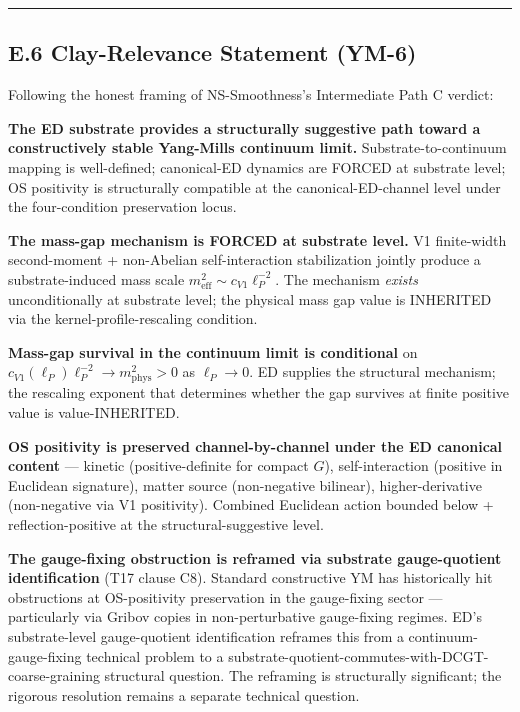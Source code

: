 \documentclass[
  11pt,a4paper]{article}
\begin{document}
\begin{center}\rule{0.5\linewidth}{0.5pt}\end{center}

\subsection{E.6 Clay-Relevance Statement
(YM-6)}\label{e.6-clay-relevance-statement-ym-6}

Following the honest framing of NS-Smoothness's Intermediate Path C
verdict:

\textbf{The ED substrate provides a structurally suggestive path toward
a constructively stable Yang-Mills continuum limit.}
Substrate-to-continuum mapping is well-defined; canonical-ED dynamics
are FORCED at substrate level; OS positivity is structurally compatible
at the canonical-ED-channel level under the four-condition preservation
locus.

\textbf{The mass-gap mechanism is FORCED at substrate level.} V1
finite-width second-moment + non-Abelian self-interaction stabilization
jointly produce a substrate-induced mass scale
\(m_\mathrm{eff}^2 \sim c_{V1}\ell_P^{-2}\). The mechanism \emph{exists}
unconditionally at substrate level; the physical mass gap value is
INHERITED via the kernel-profile-rescaling condition.

\textbf{Mass-gap survival in the continuum limit is conditional} on
\(c_{V1}(\ell_P)\ell_P^{-2} \to m_\mathrm{phys}^2 > 0\) as
\(\ell_P \to 0\). ED supplies the structural mechanism; the rescaling
exponent that determines whether the gap survives at finite positive
value is value-INHERITED.

\textbf{OS positivity is preserved channel-by-channel under the ED
canonical content} --- kinetic (positive-definite for compact \(G\)),
self-interaction (positive in Euclidean signature), matter source
(non-negative bilinear), higher-derivative (non-negative via V1
positivity). Combined Euclidean action bounded below +
reflection-positive at the structural-suggestive level.

\textbf{The gauge-fixing obstruction is reframed via substrate
gauge-quotient identification} (T17 clause C8). Standard constructive YM
has historically hit obstructions at OS-positivity preservation in the
gauge-fixing sector --- particularly via Gribov copies in
non-perturbative gauge-fixing regimes. ED's substrate-level
gauge-quotient identification reframes this from a
continuum-gauge-fixing technical problem to a
substrate-quotient-commutes-with-DCGT-coarse-graining structural
question. The reframing is structurally significant; the rigorous
resolution remains a separate technical question.
\end{document}
